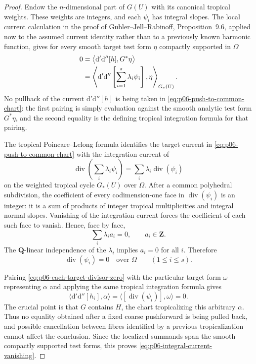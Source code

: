 \begin{proof}
Endow the $n$-dimensional part of $G(U)$ with its canonical tropical
weights.  These weights are integers, and each $\psi_i$ has integral
slopes.  The local current calculation in the proof of
Gubler--Jell--Rabinoff, Proposition~9.6, applied now to the assumed current
identity rather than to a previously known harmonic function, gives for
every smooth target test form $\eta$ compactly supported in $\Omega$
\begin{align}
  0
   &=\bigl\langle\mathrm d'\mathrm d''[h],G^*\eta\bigr\rangle\notag\\
   &=\left\langle
       \mathrm d'\mathrm d''
       \left[\sum_{i=1}^{s}\lambda_i\psi_i\right],\eta
     \right\rangle_{G_*(U)} .
\label{eq:p06-push-to-common-chart}
\end{align}
No pullback of the current $\mathrm d'\mathrm d''[h]$ is being taken in
\eqref{eq:p06-push-to-common-chart}: the first pairing is simply evaluation
against the smooth analytic test form $G^*\eta$, and the second equality is
the defining tropical integration formula for that pairing.

The tropical Poincare--Lelong formula identifies the target current in
\eqref{eq:p06-push-to-common-chart} with the integration current of
\[
       \operatorname{div}\left(\sum_i\lambda_i\psi_i\right)
       =\sum_i\lambda_i\operatorname{div}(\psi_i)
\]
on the weighted tropical cycle $G_*(U)$ over $\Omega$.  After a common
polyhedral subdivision, the coefficient of every codimension-one face in
$\operatorname{div}(\psi_i)$ is an integer: it is a sum of products of
integer tropical multiplicities and integral normal slopes.  Vanishing of
the integration current forces the coefficient of each such face to
vanish.  Hence, face by face,
\[
                         \sum_i\lambda_i a_i=0,
                         \qquad a_i\in\mathbf Z.
\]
The $\mathbf Q$-linear independence of the $\lambda_i$ implies
$a_i=0$ for all $i$.  Therefore
\begin{equation}
\label{eq:p06-each-target-divisor-zero}
                         \operatorname{div}(\psi_i)=0
                         \quad\text{over }\Omega
                         \qquad(1\leq i\leq s).
\end{equation}

Pairing \eqref{eq:p06-each-target-divisor-zero} with the particular target
form $\omega$ representing $\alpha$ and applying the same tropical
integration formula gives
\[
       \bigl\langle\mathrm d'\mathrm d''[h_i],\alpha\bigr\rangle
       =\bigl\langle[\operatorname{div}(\psi_i)],\omega\bigr\rangle
       =0.
\]
The crucial point is that $G$ contains $H$, the chart tropicalizing this
arbitrary $\alpha$.  Thus no equality obtained after a fixed coarse
pushforward is being pulled back, and possible cancellation between fibres
identified by a previous tropicalization cannot affect the conclusion.
Since the localized summands span the smooth compactly supported test
forms, this proves \eqref{eq:p06-integral-current-vanishing}.


\end{proof}
